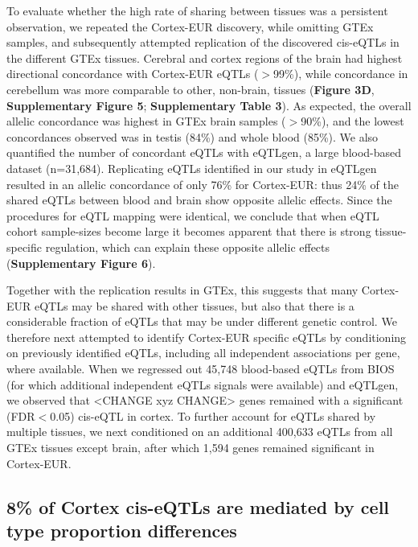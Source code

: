 To evaluate whether the high rate of sharing between tissues was a persistent observation, we repeated the Cortex-EUR discovery, while omitting GTEx samples, and subsequently attempted replication of the discovered cis-eQTLs in the different GTEx tissues\cite{consortiumGTExConsortiumAtlas2020}. Cerebral and cortex regions of the brain had highest directional concordance with Cortex-EUR eQTLs ($>$99\%), while concordance in cerebellum was more comparable to other, non-brain, tissues (\textbf{Figure 3D}, \textbf{Supplementary Figure 5}; \textbf{Supplementary Table 3}). As expected, the overall allelic concordance was highest in GTEx brain samples ($>$90\%), and the lowest concordances observed was in testis (84\%) and whole blood (85\%). We also quantified the number of concordant eQTLs with eQTLgen, a large blood-based dataset (n=31,684). Replicating eQTLs identified in our study in eQTLgen resulted in an allelic concordance of only 76\% for Cortex-EUR: thus 24\% of the shared eQTLs between blood and brain show opposite allelic effects. Since the procedures for eQTL mapping were identical, we conclude that when eQTL cohort sample-sizes become large it becomes apparent that there is strong tissue-specific regulation, which can explain these opposite allelic effects\cite{fuUnravelingRegulatoryMechanisms2012} (\textbf{Supplementary Figure 6}). 

Together with the replication results in GTEx, this suggests that many Cortex-EUR eQTLs may be shared with other tissues, but also that there is a considerable fraction of eQTLs that may be under different genetic control. We therefore next attempted to identify Cortex-EUR specific eQTLs by conditioning on previously identified eQTLs, including all independent associations per gene, where available. When we regressed out 45,748 blood-based eQTLs from BIOS\cite{zhernakovaIdentificationContextdependentExpression2017} (for which additional independent eQTLs signals were available) and eQTLgen, we observed that <CHANGE xyz CHANGE> genes remained with a significant (FDR$<$0.05) cis-eQTL in cortex. To further account for eQTLs shared by multiple tissues, we next conditioned on an additional 400,633 eQTLs from all GTEx tissues except brain, after which 1,594 genes remained significant in Cortex-EUR.

\subsection{8\% of Cortex cis-eQTLs are mediated by cell type proportion differences}
	
